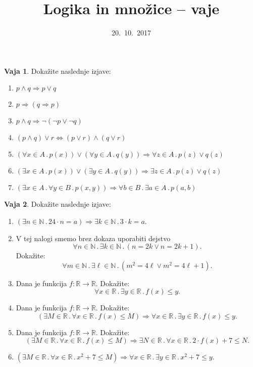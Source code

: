 \documentclass{article}
\newcommand{\RR}{\mathbb{R}}
\newcommand{\NN}{\mathbb{N}}
\newcommand{\lthen}{\Rightarrow}
\newcommand{\liff}{\Leftrightarrow}
\newcommand{\all}[1]{\forall #1 \,.\,}
\newcommand{\some}[1]{\exists #1 \,.\,}
\theoremstyle{definition}
\newtheorem{vaja}{Vaja}
\begin{document}
\title{Logika in množice -- vaje}
\date{20.~10.~2017}
\maketitle

\begin{vaja}
  Dokažite naslednje izjave:
  \begin{enumerate}
  \item $p \land q \lthen p \lor q$
  \item $p \lthen (q \lthen p)$
  \item $p \land q \lthen \lnot (\lnot p \lor \lnot q)$
  \item $(p \land q) \lor r \liff (p \lor r) \land (q \lor r)$
  \item $(\all{x \in A} p(x)) \lor (\all{y \in A} q(y)) \lthen \all{z \in A} p(z) \lor q(z)$
  \item $(\some{x \in A} p(x)) \lor (\some{y \in A} q(y)) \lthen \some{z \in A} p(z) \lor q(z)$
  \item $(\some{x \in A} \all{y \in B} p(x, y)) \lthen \all{b \in B} \some{a \in A} p(a, b)$
  \end{enumerate}
\end{vaja}

\begin{vaja}
  Dokažite naslednje izjave:
  \begin{enumerate}
  \item $(\some{n \in \NN} 24 \cdot n = a) \lthen \some{k \in \NN} 3 \cdot k = a$.
  \item V tej nalogi smemo brez dokaza uporabiti dejstvo
    $$\all{n \in \NN} \some{k \in \NN} (n = 2 k \lor n = 2 k + 1).$$ Dokažite:
    $$\all{m \in \NN} \some{\ell \in \NN} (m^2 = 4 \ell \lor m^2 = 4 \ell + 1).$$
  \item Dana je funkcija $f : \RR \to \RR$. Dokažite: $$\all{x \in \RR} \some{y \in \RR} f(x) \leq y.$$
  \item Dana je funkcija $f : \RR \to \RR$. Dokažite: $$(\some{M \in \RR} \all{x \in \RR} f(x) \leq M) \lthen \all{x \in \RR} \some{y \in \RR} f(x) \leq y.$$
  \item Dana je funkcija $f : \RR \to \RR$. Dokažite: $$(\some{M \in \RR} \all{x \in \RR} f(x) \leq M) \lthen \some{N \in \RR} \all {x \in \RR} 2 \cdot f(x) + 7 \leq N.$$
  \item $(\some{M \in \RR} \all{x \in \RR} x^2 + 7 \leq M) \lthen \all{x \in \RR} \some{y \in \RR} x^2 + 7 \leq y$.
  \end{enumerate}
\end{vaja}
\end{document}
